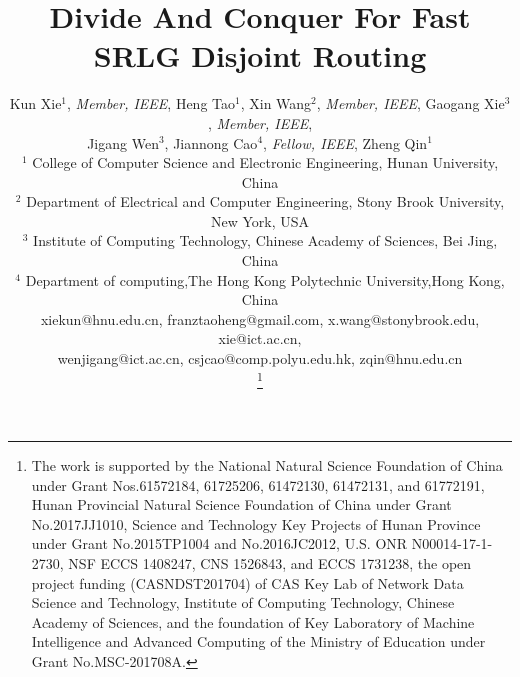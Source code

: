 \newcommand{\rev}[1]{\uwave{#1}}
\newcommand{\del}[1]{\sout{#1}}  %
\newcommand{\note}[1]{{\sffamily\itshape\bfseries\uline{#1}}}
\newcommand{\revtao}[1]{\textcolor{orange}{{#1}}}%

\newcommand{\CSLI}{SRLG Conflicting Link Set}
\newcommand{\CI}{SCLS}
\newcommand{\TopoNum}{7}
\newtheorem{theorem}{Theorem}
\newtheorem{lemma}{Lemma}
\newtheorem{definition}{Definition}




\title{Divide And Conquer For Fast SRLG Disjoint Routing}


\author{Kun Xie$^1$, \emph{Member, IEEE}, Heng Tao$^1$, Xin Wang$^2$, \emph{Member, IEEE}, Gaogang Xie$^3$, \emph{Member, IEEE},\\
Jigang Wen$^3$, Jiannong Cao$^4$, \emph{Fellow, IEEE}, Zheng Qin$^1$\\
$^1$ College of Computer Science and Electronic Engineering, Hunan University, China\\
$^2$ Department of Electrical and Computer Engineering, Stony Brook University, New York, USA\\
$^3$ Institute of Computing Technology, Chinese Academy of Sciences, Bei Jing, China \\
$^4$ Department of computing,The Hong Kong Polytechnic University,Hong Kong, China \\
xiekun@hnu.edu.cn, franztaoheng@gmail.com, x.wang@stonybrook.edu, xie@ict.ac.cn, \\
wenjigang@ict.ac.cn, csjcao@comp.polyu.edu.hk, zqin@hnu.edu.cn

\thanks{The work is supported  by the  National Natural Science Foundation of China under Grant Nos.61572184, 61725206, 61472130, 61472131, and 61772191,  Hunan Provincial Natural Science Foundation of China under Grant No.2017JJ1010,  Science and Technology Key Projects of Hunan Province under Grant No.2015TP1004 and No.2016JC2012,  U.S. ONR N00014-17-1-2730, NSF ECCS 1408247, CNS 1526843, and ECCS 1731238,  the open project funding (CASNDST201704) of CAS Key Lab of Network Data Science and Technology, Institute of Computing Technology, Chinese Academy of Sciences, and the foundation of Key Laboratory of Machine Intelligence and Advanced Computing of the Ministry of Education under Grant No.MSC-201708A.}


}

